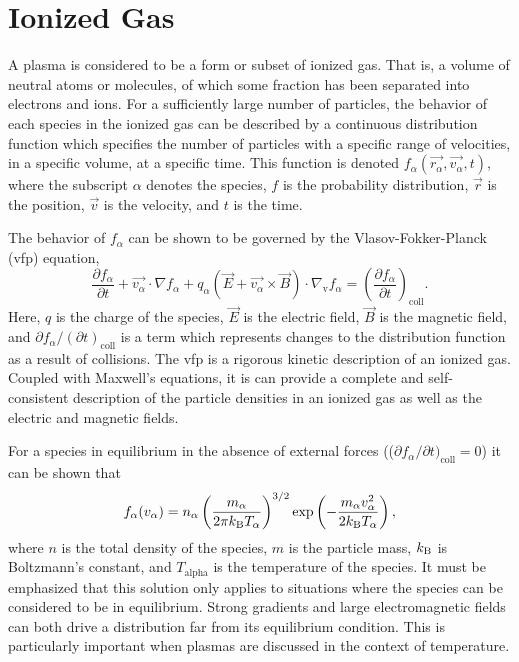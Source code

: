 \section{Ionized Gas}
A plasma is considered to be a form or subset of ionized gas. That is, a
volume of neutral atoms or molecules, of which some fraction has been
separated into electrons and ions. For a sufficiently large number of
particles, the behavior of each species in the ionized gas can be
described by a continuous distribution function which specifies the
number of particles with a specific range of velocities, in a specific
volume, at a specific time. This function is denoted
$f_\alpha(\vec{r_\alpha}, \vec{v_\alpha}, t)$, where the subscript
$\alpha$ denotes the species, $f$ is the probability distribution,
$\vec{r}$ is the position, $\vec{v}$ is the velocity, and $t$ is the
time.

The behavior of $f_\alpha$ can be shown to be governed by the
Vlasov-Fokker-Planck (\acs{vfp}) equation,
\begin{equation}\label{eq:vfp}
  \frac{\partial f_\alpha}{\partial t} + \vec{v_\alpha}\cdot\nabla f_\alpha +
  q_\alpha \left(\vec{E} + \vec{v_\alpha}\times\vec{B}\right)
  \cdot \nabla_\mathrm{v} f_\alpha = \left( \frac{\partial f_\alpha}
  {\partial t}\right)_\mathrm{coll}.
\end{equation}
Here, $q$ is the charge of the species, $\vec{E}$ is the electric field,
$\vec{B}$ is the magnetic field, and $\partial f_\alpha/(\partial
t)_\mathrm{coll}$ is a term which represents changes to the distribution
function as a result of collisions. The \acs{vfp} is a rigorous kinetic
description of an ionized gas. Coupled with Maxwell's equations, it is
can provide a complete and self-consistent description of the particle
densities in an ionized gas as well as the electric and magnetic fields.

For a species in equilibrium in the absence of external forces
(($\partial f_\alpha/\partial t)_\mathrm{coll} = 0$) it can be shown
that
\begin{equation}\label{eq:mb}
  f_\alpha(v_\alpha) =
    n_\alpha\left( \frac{m_\alpha}{2\pi k_\mathrm{B} T_\alpha}\right)^{3/2}
   \exp\left(-\frac{m_\alpha v_\alpha^2}{2k_\mathrm{B} T_\alpha}\right),
\end{equation}
where $n$ is the total density of the species, $m$ is the particle mass,
$k_\mathrm{B}$ is Boltzmann's constant, and $T_\mathrm{alpha}$ is the temperature
of the species. It must be emphasized that this solution only applies to
situations where the species can be considered to be in equilibrium.
Strong gradients and large electromagnetic fields can both drive a
distribution far from its equilibrium condition. This is particularly
important when plasmas are discussed in the context of temperature.

